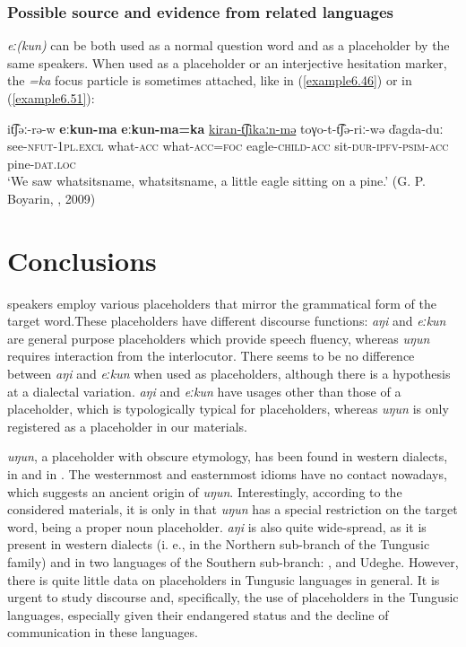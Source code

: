 \documentclass[output=paper,colorlinks,citecolor=brown]{langscibook}
\begin{document}
 \subsubsection{Possible source and evidence from related languages}
 
\textit{ eː(kun)} can be both used as a normal question word and as a placeholder by the same speakers. When used as a placeholder or an interjective hesitation marker, the \textit{=ka} focus particle is sometimes attached, like in (\ref{example6.46}) or in (\ref{example6.51}):
 
 \ea
    \label{example6.51}
    \gll it͡ʃəː-rə-w 	\textbf{eːkun-ma}	\textbf{eːkun-ma=ka}	\uline{kiran-t͡ʃikaːn-mə}   toγo-t-t͡ʃə-riː-wə	ďagda-duː\\
    see-\textsc{nfut}-1\textsc{pl.excl}	what-\textsc{acc}	what-\textsc{acc}=\textsc{foc}	eagle-\textsc{child}-\textsc{acc} sit-\textsc{dur}-\textsc{ipfv}-\textsc{psim}-\textsc{acc}	pine-\textsc{dat.loc}		\\
    \glt `We saw whatsitsname, whatsitsname, a little eagle sitting on a pine.' (G. P. Boyarin, , 2009)\\
    \z


\section{Conclusions}

 speakers employ various placeholders that mirror the grammatical form of the target word.These placeholders have different discourse functions: \textit{aŋi} and \textit{eːkun} are general purpose placeholders which provide speech fluency, whereas \textit{uŋun} requires interaction from the interlocutor. There seems to be no difference between \textit{aŋi} and \textit{eːkun} when used as placeholders, although there is a hypothesis at a dialectal variation. \textit{aŋi} and \textit{eːkun} have usages other than those of a placeholder, which is typologically typical for placeholders, whereas \textit{uŋun} is only registered as a placeholder in our materials.

\textit{uŋun}, a placeholder with obscure etymology, has been found in western  dialects, in  and in . The westernmost and easternmost idioms have no contact nowadays, which suggests an ancient origin of \textit{uŋun}. Interestingly, according to the considered materials, it is only in  that \textit{uŋun} has a special restriction on the target word, being a proper noun placeholder. \textit{aŋi} is also quite wide-spread, as it is present in western  dialects (i. e., in the Northern sub-branch of the Tungusic family) and in two languages of the Southern sub-branch: , and Udeghe. However, there is quite little data on placeholders in Tungusic languages in general. It is urgent to study discourse and, specifically, the use of placeholders in the Tungusic languages, especially given their endangered status and the decline of communication in these languages.
\end{document}
